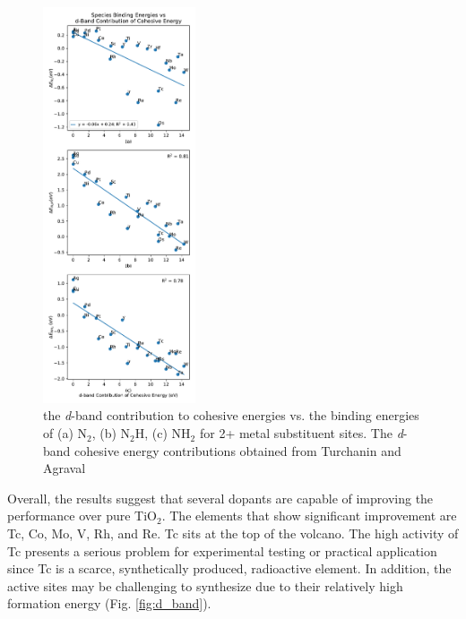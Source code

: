 \begin{figure}
    \centering
    \includegraphics[width=0.4\textwidth]{Images/species_cohesive.pdf}
    \caption{the \textit{d}-band contribution to cohesive energies vs. the binding energies of (a) N$_2$, (b) N$_2$H, (c) NH$_2$ for 2+ metal substituent sites. The \textit{d}-band cohesive energy contributions obtained from Turchanin and Agraval \cite{Turchanin_2008}}
    \label{fig:cohesive}
\end{figure}


Overall, the results suggest that several dopants are capable of improving the performance over pure TiO$_2$. The elements that show significant improvement are Tc, Co, Mo, V, Rh, and Re. Tc sits at the top of the volcano. The high activity of Tc presents a serious problem for experimental testing or practical application since Tc is a scarce, synthetically produced, radioactive element. In addition, the active sites may be challenging to synthesize due to their relatively high formation energy (Fig. \ref{fig:d_band}). 

